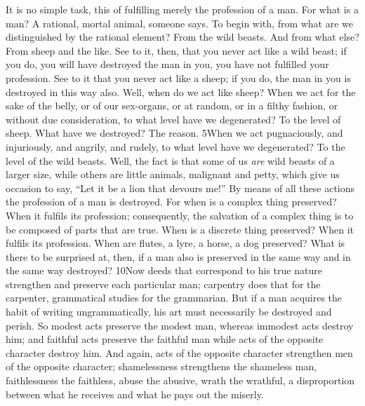 It is no simple task, this of fulfilling merely the profession of a man. For what is a man? A rational, mortal animal, someone says. To begin with, from what are we distinguished by the rational element? From the wild beasts. And from what else? From sheep and the like. See to it, then, that you never act like a wild beast; if you do, you will have destroyed the man in you, you have not fulfilled your profession. See to it that you never act like a sheep; if you do, the man in you is destroyed in this way also. Well, when do we act like sheep? When we act for the sake of the belly, or of our sex-organs, or at random, or in a filthy fashion, or without due consideration, to what level have we degenerated? To the level of sheep. What have we destroyed? The reason. 5When we act pugnaciously, and injuriously, and angrily, and rudely, to what level have we degenerated? To the level of the wild beasts. Well, the fact is that some of us \emph{are} wild beasts of a larger size, while others are little animals, malignant and petty, which give us occasion to say, ``Let it be a lion that devours me!'' By means of all these actions the profession of a man is destroyed. For when is a complex thing preserved? When it fulfils its profession; consequently, the salvation of a complex thing is to be composed of parts that are true. When is a discrete thing preserved? When it fulfils its profession. When are flutes, a lyre, a horse, a dog preserved? What is there to be surprised at, then, if a man also is preserved in the same way and in the same way destroyed? 10Now deeds that correspond to his true nature strengthen and preserve each particular man; carpentry does that for the carpenter, grammatical studies for the grammarian. But if a man acquires the habit of writing ungrammatically, his art must necessarily be destroyed and perish. So modest acts preserve the modest man, whereas immodest acts destroy him; and faithful acts preserve the faithful man while acts of the opposite character destroy him. And again, acts of the opposite character strengthen men of the opposite character; shamelessness strengthens the shameless man, faithlessness the faithless, abuse the abusive, wrath the wrathful, a disproportion between what he receives and what he pays out the miserly.

